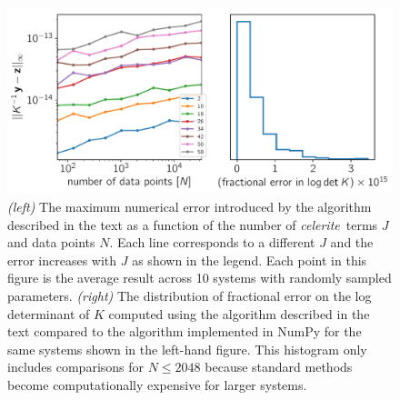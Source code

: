 \documentclass[manuscript, letterpaper]{aastex6}
\newcommand{\project}[1]{\textsf{#1}}
\newcommand{\celeriteterm}{\emph{celerite}}
\newcommand{\figurelabel}[1]{\label{fig:#1}}
\begin{document}
\begin{figure}[tp]
\begin{center}
\includegraphics[width=\textwidth]{figures/error/error.pdf}
\caption{\emph{(left)} The maximum numerical error introduced by the algorithm
    described in the text as a function of the number of \celeriteterm\ terms
    $J$ and data points $N$.
    Each line corresponds to a different $J$ and the error increases with $J$
    as shown in the legend.
    Each point in this figure is the average result across 10 systems with
    randomly sampled parameters.
\emph{(right)} The distribution of fractional error on the log determinant of
    $K$ computed using the algorithm described in the text compared to the
    algorithm implemented in \project{NumPy} \citep{Van-Der-Walt:2011} for the
    same systems shown in the left-hand figure.
    This histogram only includes comparisons for $N \le 2048$ because standard
    methods become computationally expensive for larger systems.
    \figurelabel{error}}
\end{center}
\end{figure}
\end{document}
